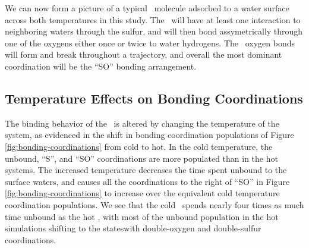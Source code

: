 We can now form a picture of a typical \suldiox~molecule adsorbed to a water surface across both temperatures in this study. The \suldiox~will have at least one interaction to neighboring waters through the sulfur, and will then bond assymetrically through one of the oxygens either once or twice to water hydrogens. The \suldiox~oxygen bonds will form and break throughout a trajectory, and overall the most dominant coordination will be the ``SO'' bonding arrangement.


\subsection {Temperature Effects on Bonding Coordinations}

The binding behavior of the \suldiox~is altered by changing the temperature of the system, as evidenced in the shift in bonding coordination populations of Figure \ref{fig:bonding-coordinations} from cold to hot. In the cold temperature, the unbound, ``S'', and ``SO'' coordinations are more populated than in the hot systems. The increased temperature decreases the time spent unbound to the surface waters, and causes all the coordinations to the right of ``SO'' in Figure \ref{fig:bonding-coordinations} to increase over the equivalent cold temperature coordination populations. We see that the cold \suldiox~spends nearly four times as much time unbound as the hot \suldiox, with most of the unbound population in the hot simulations shifting to the stateswith double-oxygen and double-sulfur coordinations. 

